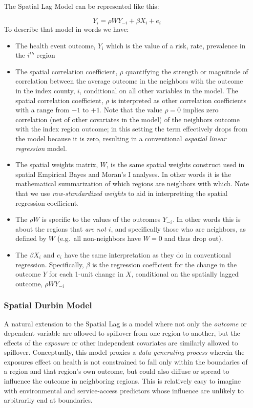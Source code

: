 \documentclass[
]{book}
\providecommand{\tightlist}{%
  \setlength{\itemsep}{0pt}\setlength{\parskip}{0pt}}
\begin{document}
The Spatial Lag Model can be represented like this:

\[Y_i=\rho WY_{-i} + \beta X_i + e_i\]
To describe that model in words we have:

\begin{itemize}
\tightlist
\item
  The health event outcome, \(Y_i\) which is the value of a risk, rate, prevalence in the \(i^{th}\) region
\item
  The spatial correlation coefficient, \(\rho\) quantifying the strength or magnitude of correlation between the average outcome in the neighbors with the outcome in the index county, \(i\), conditional on all other variables in the model. The spatial correlation coefficient, \(\rho\) is interpreted as other correlation coefficients with a range from \(-1\) to \(+1\). Note that the value \(\rho=0\) implies zero correlation (net of other covariates in the model) of the neighbors outcome with the index region outcome; in this setting the term effectively drops from the model because it is zero, resulting in a conventional \emph{aspatial linear regression} model.
\item
  The spatial weights matrix, \(W\), is the same spatial weights construct used in spatial Empirical Bayes and Moran's I analyses. In other words it is the mathematical summarization of which regions are neighbors with which. Note that we use \emph{row-standardized weights} to aid in interpretting the spatial regression coefficient.
\item
  The \(\rho W\) is specific to the values of the outcomes \(Y_{-i}\). In other words this is about the regions that \emph{are not \(i\)}, and specifically those who are neighbors, as defined by \(W\) (e.g.~all non-neighbors have \(W=0\) and thus drop out).
\item
  The \(\beta X_i\) and \(e_i\) have the same interpretation as they do in conventional regression. Specifically, \(\beta\) is the regression coefficient for the change in the outcome \(Y\) for each 1-unit change in \(X\), conditional on the spatially lagged outcome, \(\rho WY_{-i}\)
\end{itemize}

\hypertarget{spatial-durbin-model}{%
\subsubsection{Spatial Durbin Model}\label{spatial-durbin-model}}

A natural extension to the Spatial Lag is a model where not only the \emph{outcome} or dependent variable are allowed to spillover from one region to another, but the effects of the \emph{exposure} or other independent covariates are similarly allowed to spillover. Conceptually, this model proxies a \emph{data generating process} wherein the exposures effect on health is not constrained to fall only within the boundaries of a region and that region's own outcome, but could also diffuse or spread to influence the outcome in neighboring regions. This is relatively easy to imagine with environmental and service-access predictors whose influence are unlikely to arbitrarily end at boundaries.
\end{document}
